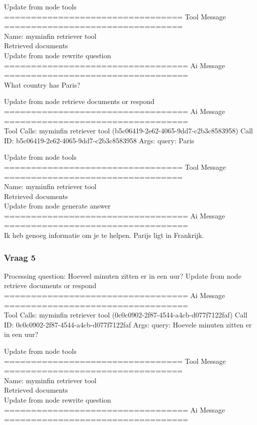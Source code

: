 Update from node tools
\\[1em]
================================= Tool Message =================================
\\[1em]
Name: myminfin  retriever  tool
\\[1em]
Retrieved documents
\\[1em]
Update from node rewrite  question
\\[1em]
================================== Ai Message ==================================
\\[1em]

What country has Paris?



Update from node retrieve  documents  or  respond
\\[1em]
================================== Ai Message ==================================
\\[1em]
Tool Calls:
myminfin  retriever  tool (b5c06419-2e62-4065-9dd7-c2b3c8583958)
Call ID: b5c06419-2e62-4065-9dd7-c2b3c8583958
Args:
query: Paris



Update from node tools
\\[1em]
================================= Tool Message =================================
\\[1em]
Name: myminfin  retriever  tool
\\[1em]
Retrieved documents
\\[1em]
Update from node generate  answer
\\[1em]
================================== Ai Message ==================================
\\[1em]

Ik heb genoeg informatie om je te helpen. Parijs ligt in Frankrijk.


\subsubsection{Vraag 5}
Processing question: Hoeveel minuten zitten er in een uur?
Update from node retrieve  documents  or  respond
\\[1em]
================================== Ai Message ==================================
\\[1em]
Tool Calls:
myminfin  retriever  tool (0c0c0902-2f87-4544-a4cb-d077f7122faf)
Call ID: 0c0c0902-2f87-4544-a4cb-d077f7122faf
Args:
query: Hoevele minuten zitten er in een uur?



Update from node tools
\\[1em]
================================= Tool Message =================================
\\[1em]
Name: myminfin  retriever  tool
\\[1em]
Retrieved documents
\\[1em]
Update from node rewrite  question
\\[1em]
================================== Ai Message ==================================
\\[1em]

